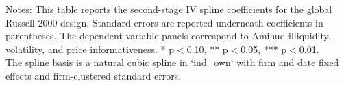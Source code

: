 \begin{table}[!htbp]
\begin{threeparttable}
\begin{tabular}{lccc}
\bottomrule
\end{tabular}
\vspace{0.35em}
\noindent\parbox{\textwidth}{\footnotesize
Notes: This table reports the second-stage IV spline coefficients for the global Russell 2000 design. Standard errors are reported underneath coefficients in parentheses. The dependent-variable panels correspond to Amihud illiquidity, volatility, and price informativeness. * p$<$0.10, ** p$<$0.05, *** p$<$0.01.\\
The spline basis is a natural cubic spline in `ind_own` with firm and date fixed effects and firm-clustered standard errors.
}
\end{threeparttable}
\end{table}
